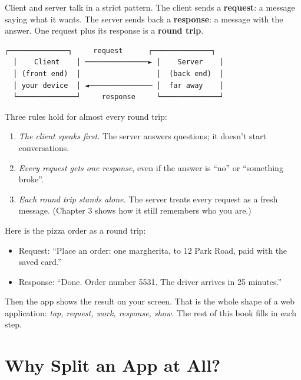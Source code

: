 Client and server talk in a strict pattern. The client sends a \textbf{request}: a message saying what it wants. The server sends back a \textbf{response}: a message with the answer. One request plus its response is a \textbf{round trip}.

\begin{codeblock}
\begin{Verbatim}[breaklines=false, fontsize=\fontsize{8.8}{8.68}\selectfont, fontfamily=diagrammono, formatcom=\diagramlines]
  ┌──────────────┐     request      ┌──────────────┐
  │    Client    │ ───────────────► │    Server    │
  │ (front end)  │                  │  (back end)  │
  │ your device  │ ◄─────────────── │  far away    │
  └──────────────┘     response     └──────────────┘
\end{Verbatim}
\end{codeblock}

Three rules hold for almost every round trip:

\begin{enumerate}
\def\labelenumi{\arabic{enumi}.}
\tightlist
\item
  \emph{The client speaks first.} The server answers questions; it doesn't start conversations.
\item
  \emph{Every request gets one response}, even if the answer is ``no'' or ``something broke''.
\item
  \emph{Each round trip stands alone.} The server treats every request as a fresh message. (Chapter 3 shows how it still remembers who you are.)
\end{enumerate}

Here is the pizza order as a round trip:

\begin{itemize}
\tightlist
\item
  Request: ``Place an order: one margherita, to 12 Park Road, paid with the saved card.''
\item
  Response: ``Done. Order number 5531. The driver arrives in 25 minutes.''
\end{itemize}

Then the app shows the result on your screen. That is the whole shape of a web application: \emph{tap, request, work, response, show.} The rest of this book fills in each step.

\section{Why Split an App at All?}\label{01-two-sides-of-every-app:why-split-an-app-at-all}

